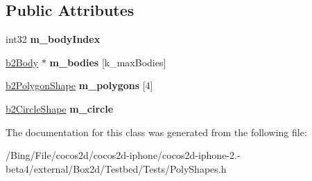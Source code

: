 \subsection*{Public Attributes}
\begin{DoxyCompactItemize}
\item 
\hypertarget{class_poly_shapes_a3235e07fa1a2e0ee3bf054c77f170224}{int32 {\bfseries m\-\_\-body\-Index}}\label{class_poly_shapes_a3235e07fa1a2e0ee3bf054c77f170224}

\item 
\hypertarget{class_poly_shapes_a337a4fa9c77f0aed2e4395a1328aadaf}{\hyperlink{classb2_body}{b2\-Body} $\ast$ {\bfseries m\-\_\-bodies} \mbox{[}k\-\_\-max\-Bodies\mbox{]}}\label{class_poly_shapes_a337a4fa9c77f0aed2e4395a1328aadaf}

\item 
\hypertarget{class_poly_shapes_a6851a8809aa298df2a1affbf34b6a794}{\hyperlink{classb2_polygon_shape}{b2\-Polygon\-Shape} {\bfseries m\-\_\-polygons} \mbox{[}4\mbox{]}}\label{class_poly_shapes_a6851a8809aa298df2a1affbf34b6a794}

\item 
\hypertarget{class_poly_shapes_a6c6651ea11adeee02ea690604c471afb}{\hyperlink{classb2_circle_shape}{b2\-Circle\-Shape} {\bfseries m\-\_\-circle}}\label{class_poly_shapes_a6c6651ea11adeee02ea690604c471afb}

\end{DoxyCompactItemize}


The documentation for this class was generated from the following file\-:\begin{DoxyCompactItemize}
\item 
/\-Bing/\-File/cocos2d/cocos2d-\/iphone/cocos2d-\/iphone-\/2.-\/beta4/external/\-Box2d/\-Testbed/\-Tests/Poly\-Shapes.\-h\end{DoxyCompactItemize}
